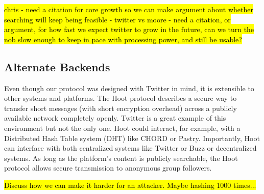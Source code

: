 \hl{
chris 
- need a citation for core growth so we can make argument about whether searching will keep being feasible
- twitter vs moore
- need a citation, or argument, for how fast we expect twitter to grow in the future, can we turn the nob slow enough to keep in pace with processing power, and still be usable? 
}

\subsection{Alternate Backends}

Even though our protocol was designed with Twitter in mind, it is extensible to other systems and platforms. The Hoot protocol describes a secure way to transfer short messages (with short encryption overhead) across a publicly available network completely openly. Twitter is a great example of this environment but not the only one. Hoot could interact, for example, with a Distributed Hash Table system (DHT) like CHORD or Pastry. Importantly, Hoot can interface with both centralized systems like Twitter or Buzz or decentralized systems. As long as the platform's content is publicly searchable, the Hoot protocol allows secure transmission to anonymous group followers.

\hl{Discuss how we can make it harder for an attacker. Maybe hashing 1000 times...}
